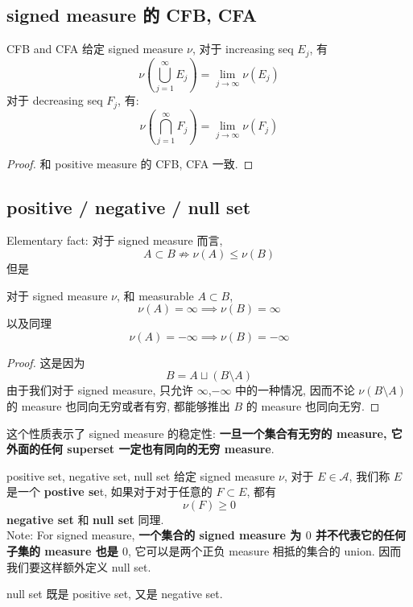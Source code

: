 \documentclass[lang=cn,11pt]{elegantbook}
\begin{document}
\subsection{signed measure 的 CFB, CFA }
\begin{proposition}{CFB and CFA}
给定 signed measure $\nu$,   对于 increasing seq $E_j$, 有 \[
\nu(\bigcup_{j=1}^\infty E_j)  = \lim_{j\to \infty} \nu(E_j) 
\]
对于 decreasing seq $F_j$, 有: \[
\nu(\bigcap_{j=1}^\infty F_j)  = \lim_{j\to \infty} \nu(F_j) 
\]
\end{proposition}
\begin{proof}
    和 positive measure 的 CFB, CFA 一致.
\end{proof}

\subsection{positive / negative / null set}

Elementary fact: 对于 signed measure 而言, \[
A \subset B \not \Longrightarrow \nu(A) \leq \nu (B)
\]
但是
\begin{lemma}
对于 signed measure $\nu$, 和 measurable $A \subset B$, 
\[
\nu(A) = \infty \implies \nu(B) = \infty
\]以及同理 \[
\nu(A) = -\infty \implies \nu(B) = - \infty
\]
\end{lemma}
\begin{proof}
    这是因为 \[
B = A \sqcup (B \setminus A)
\]
由于我们对于 signed measure, 只允许 $\infty$,$-\infty$ 中的一种情况, 因而不论 $\nu(B \setminus A)$ 的 measure 也同向无穷或者有穷, 都能够推出 $B$ 的 measure 也同向无穷.
\end{proof}
\begin{remark}
    这个性质表示了 signed measure 的稳定性: \textbf{一旦一个集合有无穷的 measure, 它外面的任何 superset 一定也有同向的无穷 measure}.
\end{remark}
 

\begin{definition}{positive set, negative set, null set}
    给定 signed measure $\nu$, 对于 $E \in \mathcal{A}$, 我们称 $E$ 是一个 \textbf{postive se}t, 如果对于对于任意的 $F \subset E$, 都有 \[
    \nu(F) \geq 0
    \] \textbf{negative set} 和 \textbf{null set} 同理.\\
Note: For signed measure,\textbf{ 一个集合的 signed measure 为 $0$ 并不代表它的任何子集的 measure 也是 $0$}, 它可以是两个正负 measure 相抵的集合的 union. 因而我们要这样额外定义 null set.
\end{definition}
\begin{remark}
    null set 既是 positive set, 又是 negative set.
\end{remark}
\end{document}
